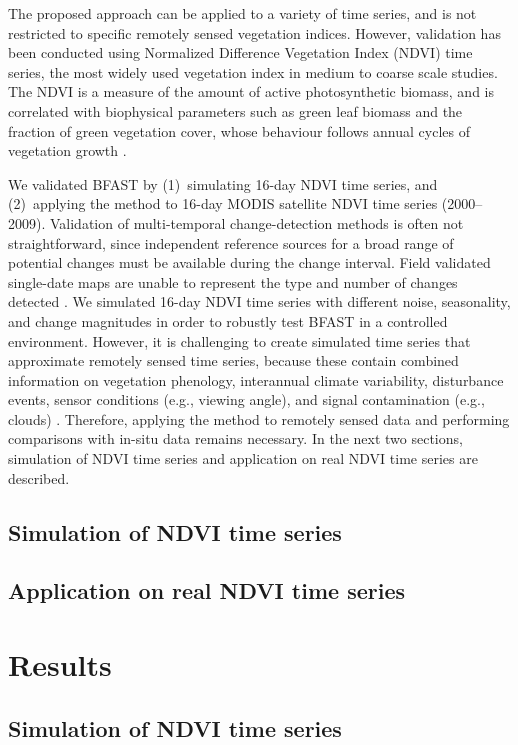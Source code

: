 \documentclass[authoryear,preprint,review,10pt]{elsarticle}
\begin{document}
The proposed approach can be applied to a variety of time series, and is not
restricted to specific remotely sensed vegetation indices. However, validation
has been conducted using Normalized Difference Vegetation Index (NDVI) time
series, the most widely used vegetation index in medium to coarse scale studies.
The NDVI is a measure of the amount of active photosynthetic biomass, and is
correlated with biophysical parameters such as green leaf biomass and the
fraction of green vegetation cover, whose behaviour follows annual cycles of
vegetation growth \citep{Myneni1995,Tucker1979}.

We validated BFAST by (1)~simulating 16-day NDVI time series, and (2)~applying
the method to 16-day MODIS satellite NDVI time series (2000--2009). Validation
of multi-temporal change-detection methods is often not straightforward, since
independent reference sources for a broad range of potential changes must be
available during the change interval. Field validated single-date maps are
unable to represent the type and number of changes detected \citep{Kennedy2007}.
We simulated 16-day NDVI time series with different noise, seasonality, and
change magnitudes in order to robustly test BFAST in a controlled environment.
However, it is challenging to create simulated time series that approximate
remotely sensed time series, because these contain combined information on
vegetation phenology, interannual climate variability, disturbance events,
sensor conditions (e.g., viewing angle), and signal contamination (e.g., clouds)
\citep{Zhang2009}. Therefore, applying the method to remotely sensed data and
performing comparisons with in-situ data remains necessary. In the next two
sections, simulation of NDVI time series and application on real NDVI time
series are described.

\subsection{Simulation of NDVI time series}

\subsection{Application on real NDVI time series}\label{sec:RealData}

\section{Results}

\subsection{Simulation of NDVI time series}
\end{document}
